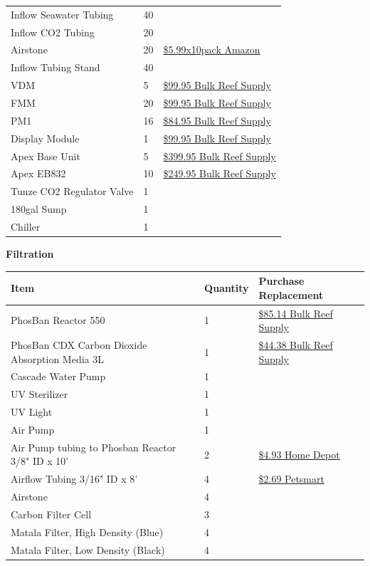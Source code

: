 \documentclass[]{book}
\begin{document}
\begin{longtable}[]{@{}lll@{}}
Inflow Seawater Tubing & 40 &\tabularnewline
Inflow CO2 Tubing & 20 &\tabularnewline
Airstone & 20 &
\href{https://www.amazon.com/Pawfly-Cylinder-Diffuser-Airstones-Hydroponics/dp/B075QCWGZQ/ref=sr_1_5?crid=3EXLLKKDA2NYZ\&keywords=airstones+for+aquariums\&qid=1572983301\&sprefix=airstone\%2Caps\%2C197\&sr=8-5}{\$5.99x10pack
Amazon}\tabularnewline
Inflow Tubing Stand & 40 &\tabularnewline
VDM & 5 &
\href{https://www.bulkreefsupply.com/led-pumps-control-module-vdm-neptune-systems.html}{\$99.95
Bulk Reef Supply}\tabularnewline
FMM & 20 &
\href{https://www.bulkreefsupply.com/fmm-fluid-monitoring-module-neptune-systems.html}{\$99.95
Bulk Reef Supply}\tabularnewline
PM1 & 16 &
\href{https://www.bulkreefsupply.com/ph-orp-probe-module-pm1-neptune-systems.html}{\$84.95
Bulk Reef Supply}\tabularnewline
Display Module & 1 &
\href{https://www.bulkreefsupply.com/apex-display-module-neptune-systems.html}{\$99.95
Bulk Reef Supply}\tabularnewline
Apex Base Unit & 5 &
\href{https://www.bulkreefsupply.com/apex-controller-base-unit-neptune-systems.html}{\$399.95
Bulk Reef Supply}\tabularnewline
Apex EB832 & 10 &
\href{https://www.bulkreefsupply.com/energybar-832-neptune-systems.html}{\$249.95
Bulk Reef Supply}\tabularnewline
Tunze CO2 Regulator Valve & 1 &\tabularnewline
180gal Sump & 1 &\tabularnewline
Chiller & 1 &\tabularnewline
\bottomrule
\end{longtable}

 \textbf{Filtration}

\begin{longtable}[]{@{}lll@{}}
\toprule
Item & Quantity & Purchase Replacement\tabularnewline
\midrule
\endhead
PhosBan Reactor 550 & 1 &
\href{https://www.bulkreefsupply.com/phosban-reactor-550.html}{\$85.14
Bulk Reef Supply}\tabularnewline
PhosBan CDX Carbon Dioxide Absorption Media 3L & 1 &
\href{https://www.bulkreefsupply.com/cdx-carbon-dioxide-adsorption-media-two-little-fishies.html}{\$44.38
Bulk Reef Supply}\tabularnewline
Cascade Water Pump & 1 &\tabularnewline
UV Sterilizer & 1 &\tabularnewline
UV Light & 1 &\tabularnewline
Air Pump & 1 &\tabularnewline
Air Pump tubing to Phosban Reactor 3/8" ID x 10' & 2 &
\href{https://www.homedepot.com/p/UDP-3-8-in-I-D-x-1-2-in-O-D-x-10-ft-Clear-Vinyl-Tubing-T10006008/304185141}{\$4.93
Home Depot}\tabularnewline
Airflow Tubing 3/16" ID x 8' & 4 &
\href{https://www.petsmart.com/fish/filters-and-pumps/air-and-water-pumps/grreat-choice-airline-tubing-5202767.html}{\$2.69
Petsmart}\tabularnewline
Airstone & 4 &\tabularnewline
Carbon Filter Cell & 3 &\tabularnewline
Matala Filter, High Density (Blue) & 4 &\tabularnewline
Matala Filter, Low Density (Black) & 4 &\tabularnewline
\bottomrule
\end{longtable}
\end{document}
